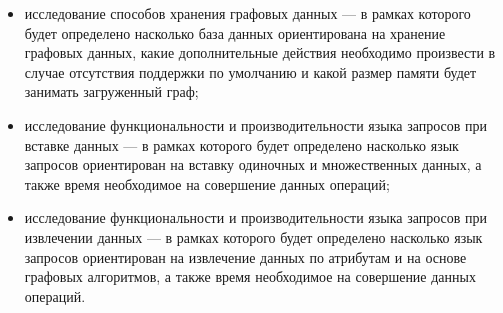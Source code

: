 \begin{itemize}
    \item исследование способов хранения графовых данных — в рамках которого будет определено насколько база данных ориентирована на хранение графовых данных, какие дополнительные действия необходимо произвести в случае отсутствия поддержки по умолчанию и какой размер памяти будет занимать загруженный граф;
    \item исследование функциональности и производительности языка запросов при вставке данных — в рамках которого будет определено насколько язык запросов ориентирован на вставку одиночных и множественных данных, а также время необходимое на совершение данных операций;
    \item исследование функциональности и производительности языка запросов при извлечении данных — в рамках которого будет определено насколько язык запросов ориентирован на извлечение данных по атрибутам и на основе графовых алгоритмов, а также время необходимое на совершение данных операций.
\end{itemize}


